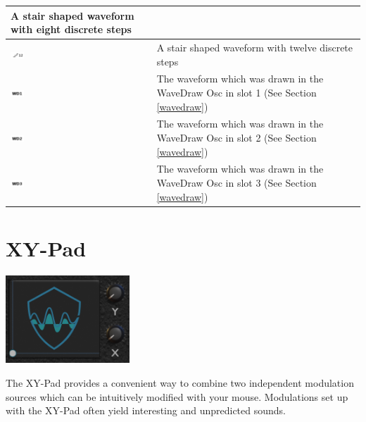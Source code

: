 {\begin{tabular}{| L{0.12\textwidth} | L{0.8\textwidth} |}
        A stair shaped waveform with eight discrete steps\\
        \hline
        \includegraphics[width=0.1\textwidth]{graphics/LFO/stair12.png}   &
        A stair shaped waveform with twelve discrete steps\\
        \hline
        \includegraphics[width=0.1\textwidth]{graphics/LFO/wavedraw1.png} &
        The waveform which was drawn in the WaveDraw Osc in slot 1 (See Section \ref{wavedraw})\\
        \hline
        \includegraphics[width=0.1\textwidth]{graphics/LFO/wavedraw2.png} &
        The waveform which was drawn in the WaveDraw Osc in slot 2 (See Section \ref{wavedraw})\\
        \hline
        \includegraphics[width=0.1\textwidth]{graphics/LFO/wavedraw3.png} &
        The waveform which was drawn in the WaveDraw Osc in slot 3 (See Section \ref{wavedraw})\\
        \hline
    \end{tabular}
}


\section{XY-Pad}
\label{xy}
\begin{center}
    \includegraphics[width=0.35\textwidth]{graphics/XY_pad.png}
\end{center}

The XY-Pad provides a convenient way to combine two independent modulation sources which can be intuitively modified with your mouse. Modulations set up with the XY-Pad often yield interesting and unpredicted sounds.

